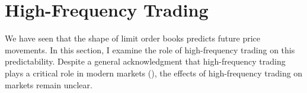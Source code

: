 



\section{High-Frequency Trading}
	We have seen that the shape of limit order books predicts future price movements. In this section, I examine the role of high-frequency trading on this predictability. Despite a general acknowledgment that high-frequency trading plays a critical role in modern markets (\citet{OHara2015}), the effects of high-frequency trading on markets remain unclear.

